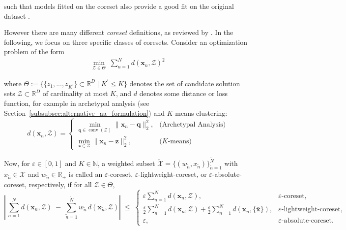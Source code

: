 \documentclass{article}
\begin{document}
such that models fitted on the coreset also provide a good fit on the original dataset \autocite{feldmanIntroductionCoresetsUpdated2020}.

However there are many different \emph{coreset} definitions, as reviewed by \textcite{feldmanIntroductionCoresetsUpdated2020}. In the following, we focus on three specific classes of coresets. Consider an optimization problem of the form
\begin{equation}
    \begin{aligned}
        \underset{\mathcal{Z} \in \Theta}{\min} \; \sum_{n=1}^N d(\mathbf{x}_n, \mathcal{Z})^2
    \end{aligned}
\end{equation}

where $\Theta := \{ \{z_1, ..., z_{K^\prime}\} \subset \mathbb{R}^D \mid K^\prime \leq K\}$ denotes the set of candidate solution sets $\mathcal{Z} \subset \mathbb{R}^D$ of cardinality at most $K$, and $d$ denotes some distance or loss function, for example in archetypal analysis (see Section~\ref{subsubsec:alternative_aa_formulation}) and $K$-means clustering:
\begin{equation}
    \label{eq:distances}
    d(\mathbf{x}_n, \mathcal{Z})
    =
    \begin{cases}
        \displaystyle
        \min_{\mathbf{q}\in\operatorname{conv}(\mathcal{Z})}\| \mathbf{x}_n - \mathbf{q}\|_2^2,
        &\text{(Archetypal Analysis)} \\
        \displaystyle
        \min_{\mathbf{z} \in\mathcal{Z}}\| \mathbf{x}_n - \mathbf{z} \|_2^2,
        &\text{($K$-means)}
    \end{cases}
\end{equation}

Now, for $\varepsilon \in [0, 1]$ and $K \in \mathbb{N}$, a weighted subset $\tilde{\mathcal{X}} = \{(w_{\tilde{n}}, x_{\tilde{n}})\}_{\tilde{n}=1}^{\tilde{N}}$ with $x_{\tilde{n}} \in \mathcal{X}$ and $w_{\tilde{n}} \in \mathbb{R}_+$ is called an $\varepsilon$-coreset, $\varepsilon$-lightweight-coreset, or $\varepsilon$-absolute-coreset, respectively, if for all $\mathcal{Z} \in \Theta$,
\begin{equation}
    \label{eq:coreset-cases}
    \left|\,
        \sum_{n=1}^N d(\mathbf{x}_n,\mathcal{Z})
        \;-\;
        \sum_{\tilde n=1}^{\tilde N} w_{\tilde n} \, d(\mathbf{x}_{\tilde n},\mathcal{Z})
    \right|
    \;\le\;
    \begin{cases}
        \varepsilon \sum_{n=1}^N d(\mathbf{x}_n,\mathcal{Z}),
        & \varepsilon\text{-coreset},\\
        \frac{\varepsilon}{2} \sum_{n=1}^N d(\mathbf{x}_n, \mathcal{Z}) + \frac{\varepsilon}{2} \sum_{n=1}^N d(\mathbf{x}_n, \{ \bar{\mathbf{x}} \}),
        & \varepsilon\text{-lightweight-coreset},\\
        \varepsilon,
        & \varepsilon\text{-absolute-coreset}.
    \end{cases}
\end{equation}
\end{document}
